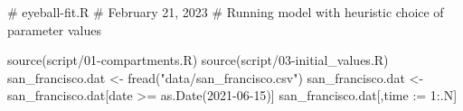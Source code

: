 \documentclass[
  11pt,
  letterpaper,
  DIV=11,
  numbers=noendperiod]{scrartcl}
\newenvironment{Shaded}{\begin{snugshade}}{\end{snugshade}}
\newcommand{\CommentTok}[1]{\textcolor[rgb]{0.37,0.37,0.37}{#1}}
\newcommand{\DecValTok}[1]{\textcolor[rgb]{0.68,0.00,0.00}{#1}}
\newcommand{\ErrorTok}[1]{\textcolor[rgb]{0.68,0.00,0.00}{#1}}
\newcommand{\FunctionTok}[1]{\textcolor[rgb]{0.28,0.35,0.67}{#1}}
\newcommand{\NormalTok}[1]{\textcolor[rgb]{0.00,0.23,0.31}{#1}}
\newcommand{\OtherTok}[1]{\textcolor[rgb]{0.00,0.23,0.31}{#1}}
\newcommand{\SpecialCharTok}[1]{\textcolor[rgb]{0.37,0.37,0.37}{#1}}
\newcommand{\StringTok}[1]{\textcolor[rgb]{0.13,0.47,0.30}{#1}}
\begin{document}
\begin{Shaded}
\begin{Highlighting}[]
\CommentTok{\# eyeball{-}fit.R}
\CommentTok{\# February 21, 2023}
\CommentTok{\# Running model with heuristic choice of parameter values}

\FunctionTok{source}\NormalTok{(}\StringTok{\textquotesingle{}script/01{-}compartments.R\textquotesingle{}}\NormalTok{)}
\FunctionTok{source}\NormalTok{(}\StringTok{\textquotesingle{}script/03{-}initial\_values.R\textquotesingle{}}\NormalTok{)}
\NormalTok{san\_francisco.dat }\OtherTok{\textless{}{-}} \FunctionTok{fread}\NormalTok{(}\StringTok{"data/san\_francisco.csv"}\NormalTok{)}
\NormalTok{san\_francisco.dat }\OtherTok{\textless{}{-}}\NormalTok{ san\_francisco.dat[date }\SpecialCharTok{\textgreater{}=} \FunctionTok{as.Date}\NormalTok{(}\StringTok{\textquotesingle{}2021{-}06{-}15\textquotesingle{}}\NormalTok{)]}
\NormalTok{san\_francisco.dat[,time }\SpecialCharTok{:}\ErrorTok{=} \DecValTok{1}\SpecialCharTok{:}\NormalTok{.N]}


\end{Highlighting}
\end{Shaded}
\end{document}
